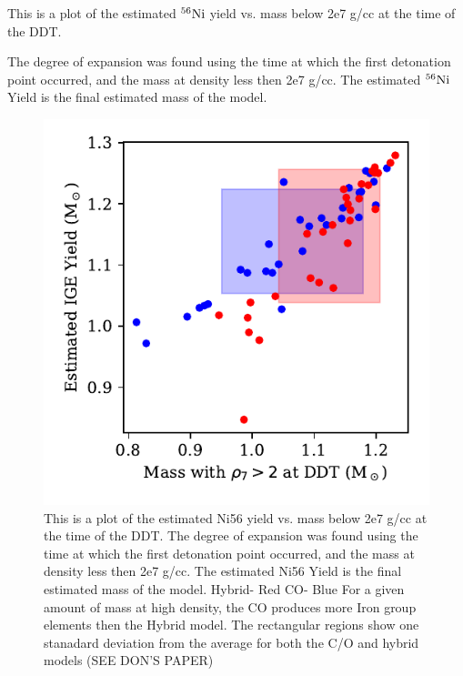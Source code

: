 \documentclass[iop,apj]{emulateapj}
\newcommand{\Ni}[1]{\ensuremath{{}^{#1}{\rm Ni}}}
\begin{document}
This is a plot of the estimated \Ni{56} yield vs. mass below 2e7 g/cc at
the time of the DDT.

The degree of expansion was found using the time at which the first
detonation point occurred, and the mass at density less then 2e7 g/cc. The
estimated \Ni{56} Yield is the final estimated mass of the model.

\begin{figure}
\includegraphics[width=\columnwidth]{figures/ni56_yield_vs_mass_at_high_dens.pdf}
\caption{\label{fig:masshighdens}
This is a plot of the estimated Ni56 yield vs. mass below 2e7 g/cc at the time of the DDT. 
The degree of expansion was found using the time at which the first detonation point occurred, and the mass at density less then 2e7 g/cc. The estimated Ni56 Yield is the final estimated mass of the model. 
Hybrid- Red
CO- Blue
For a given amount of mass at high density, the CO produces more Iron group elements then the Hybrid model.  
The rectangular regions show one stanadard deviation from the average for both the C/O and hybrid 
models (SEE DON'S PAPER)
}
\end{figure}
\end{document}
